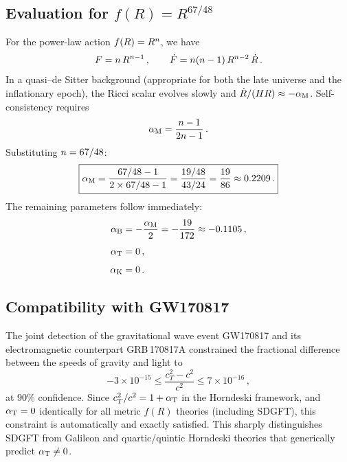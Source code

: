 \documentclass[amsmath,amssymb,aps,prd,twocolumn,superscriptaddress,nofootinbib]{revtex4-2}
\begin{document}
\subsection{Evaluation for $f(R) = R^{67/48}$}

For the power-law action $f(R) = R^{n}$, we have
\begin{equation}
  F = n\,R^{n-1}\,,\qquad
  \dot{F} = n(n-1)\,R^{n-2}\,\dot{R}\,.
  \label{eq:F_derivatives}
\end{equation}
In a quasi--de Sitter background (appropriate for both the late
universe and the inflationary epoch), the Ricci scalar evolves
slowly and $\dot{R}/(HR) \approx -\alpha_{\mathrm{M}}$.  Self-consistency
requires~\cite{Amendola2007,Pogosian2016}
\begin{equation}
  \alpha_{\mathrm{M}} = \frac{n - 1}{2n - 1}\,.
  \label{eq:aM_quasidS}
\end{equation}
Substituting $n = 67/48$:
\begin{equation}
  \boxed{%
    \aM = \frac{67/48 - 1}{2 \times 67/48 - 1}
        = \frac{19/48}{43/24}
        = \frac{19}{86}
        \approx 0.2209\,.
  }
  \label{eq:aM_value}
\end{equation}
The remaining parameters follow immediately:
\begin{align}
  \alpha_{\mathrm{B}} &= -\frac{\alpha_{\mathrm{M}}}{2} = -\frac{19}{172}
       \approx -0.1105\,,
  \label{eq:aB_value} \\[4pt]
  \alpha_{\mathrm{T}} &= 0\,,
  \label{eq:aT_value} \\[4pt]
  \alpha_{\mathrm{K}} &= 0\,.
  \label{eq:aK_value}
\end{align}

\subsection{Compatibility with GW170817}

The joint detection of the gravitational wave event GW170817 and
its electromagnetic counterpart GRB\,170817A constrained the
fractional difference between the speeds of gravity and light
to~\cite{Abbott2017_GW170817}
\begin{equation}
  -3 \times 10^{-15} \leq
  \frac{c_T^2 - c^2}{c^2} \leq
  7 \times 10^{-16}\,,
  \label{eq:GW170817}
\end{equation}
at $90\%$ confidence.  Since $c_T^2/c^2 = 1 + \alpha_{\mathrm{T}}$ in the
Horndeski framework, and $\alpha_{\mathrm{T}} = 0$ identically for all metric
$f(R)$ theories (including SDGFT), this constraint is
automatically and exactly satisfied.  This sharply distinguishes
SDGFT from Galileon and quartic/quintic Horndeski theories that
generically predict $\alpha_{\mathrm{T}} \neq 0$.
\end{document}
